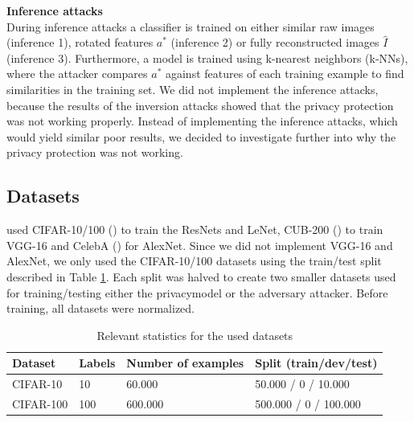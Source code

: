 

\textbf{Inference attacks}\\
During inference attacks a classifier is trained on either similar raw images (inference 1), rotated features $a^*$ (inference 2) or fully reconstructed images $\hat{I}$ (inference 3). Furthermore, a model is trained using k-nearest neighbors (k-NNs), where the attacker compares $a^*$ against features of each training example to find similarities in the training set. We did not implement the inference attacks, because the results of the inversion attacks showed that the privacy protection was not working properly. Instead of implementing the inference attacks, which would yield similar poor results, we decided to investigate further into why the privacy protection was not working.


\subsection{Datasets}

\citet{xiang2020interpretable} used CIFAR-10/100 (\citet{cifar10-cifar100}) to train the ResNets and LeNet, CUB-200 (\citet{WelinderEtal2010}) to train VGG-16 and CelebA (\citet{CelebA}) for AlexNet. Since we did not implement VGG-16 and AlexNet, we only used the CIFAR-10/100 datasets using the train/test split described in Table \ref{dataset}. Each split was halved to create two smaller datasets used for training/testing either the privacymodel or the adversary attacker. Before training, all datasets were normalized. 

\begin{table}[t]
    \centering
    \setlength{\abovecaptionskip}{5pt}
    \caption{Relevant statistics for the used datasets}
    \begin{tabular}{l||l|l|l}
    \hline
    \textbf{Dataset} & \textbf{Labels} & \textbf{Number of examples} & \textbf{Split (train/dev/test)} \\
    \hline 
    CIFAR-10 & 10 & 60.000 & 50.000 / 0 / 10.000 \\
    CIFAR-100 & 100 & 600.000 & 500.000 / 0 / 100.000 \\
    \end{tabular}
    \label{dataset}
\end{table}


